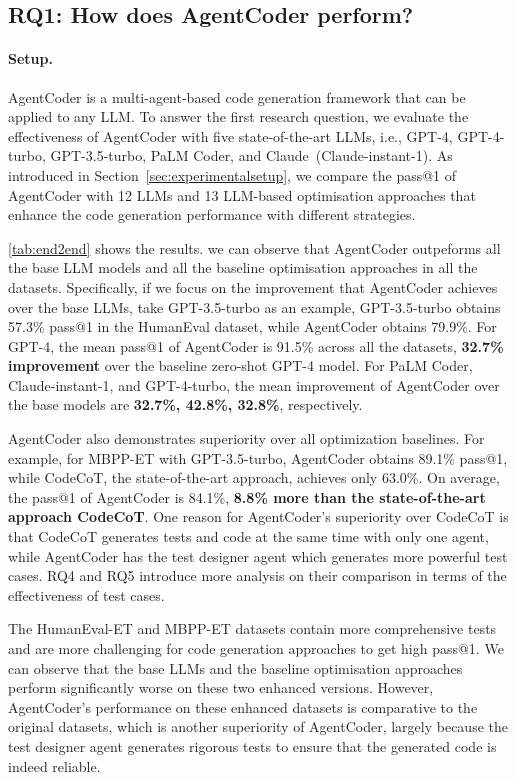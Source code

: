\documentclass[manuscript,screen,review]{acmart}
\newcommand{\xxx}{AgentCoder\xspace}
\begin{document}
\subsection{RQ1: How does \xxx perform?}
\paragraph{Setup.} 
\xxx is a multi-agent-based code generation framework that can be applied to any LLM.
To answer the first research question, we evaluate the effectiveness of \xxx with five state-of-the-art LLMs, i.e., GPT-4, GPT-4-turbo, GPT-3.5-turbo, PaLM Coder, and Claude~(Claude-instant-1). 
As introduced in Section~\ref{sec:experimentalsetup},
we compare the pass@1 of \xxx with 12 LLMs and 13 LLM-based optimisation approaches that enhance the code generation performance with different strategies.

\cref{tab:end2end} shows the results. we can observe that \xxx outpeforms all the base LLM models and all the baseline optimisation approaches in all the datasets. 
Specifically, if we focus on the improvement that \xxx achieves over the base LLMs, take GPT-3.5-turbo as an example, 
GPT-3.5-turbo obtains 57.3\% pass@1 in the HumanEval dataset, while \xxx obtains 79.9\%.
For GPT-4, the mean pass@1 of \xxx is 91.5\% across all the datasets, \textbf{32.7\% improvement} over the baseline zero-shot GPT-4 model.
For PaLM Coder, Claude-instant-1, and GPT-4-turbo, the mean improvement of \xxx over the base models are \textbf{32.7\%, 42.8\%, 32.8\%}, respectively.

\xxx also demonstrates superiority over all optimization baselines.
For example, for MBPP-ET with GPT-3.5-turbo,
\xxx obtains 89.1\% pass@1, while CodeCoT, the state-of-the-art approach, achieves only 63.0\%. 
On average, the pass@1 of \xxx is 84.1\%, \textbf{8.8\% more than the state-of-the-art approach CodeCoT}.
{\color{black}One reason for \xxx's superiority over CodeCoT is that CodeCoT generates tests and code at the same time with only one agent,}
while \xxx has the test designer agent which generates more powerful test cases. 
RQ4 and RQ5 introduce more analysis on their comparison in terms of the effectiveness of test cases. 

The HumanEval-ET and MBPP-ET datasets contain more comprehensive tests and are more challenging for code generation approaches to get high pass@1.
We can observe that the base LLMs and the baseline optimisation approaches perform significantly worse on these two enhanced versions.
However, \xxx's performance on these enhanced datasets is comparative to the original datasets, which is another superiority of \xxx, largely because the test designer agent generates rigorous tests to ensure that the generated code is indeed reliable.
\end{document}
